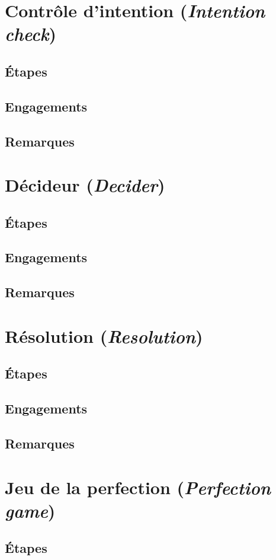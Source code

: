 \documentclass{book}
\begin{document}
\section{Contrôle d'intention (\emph{Intention check})}
\subsection{Étapes}
\subsection{Engagements}
\subsection{Remarques}

\section{Décideur (\emph{Decider})}
\subsection{Étapes}
\subsection{Engagements}
\subsection{Remarques}

\section{Résolution (\emph{Resolution})}
\subsection{Étapes}
\subsection{Engagements}
\subsection{Remarques}

\section{Jeu de la perfection (\emph{Perfection game})}
\subsection{Étapes}
\end{document}
